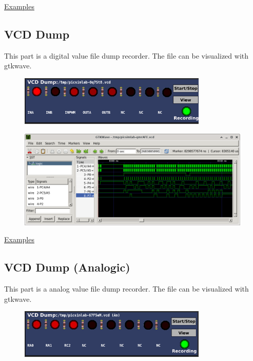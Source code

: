 \href{https://lcgamboa.github.io/picsimlab_examples/examples/examples_index.html\#Signal\_Generator}{Examples}

\subsection{VCD Dump}

This part is a digital value file dump recorder. The file can be visualized with gtkwave. 

\begin{figure}[H]
\center
\includegraphics[width=0.8\textwidth]{img/part_vcd_dump.png} 
\end{figure}



\begin{figure}[H]
\center
\includegraphics[width=0.99\textwidth]{img/part_vcd_dump_gtkwave.png} 
\end{figure}

\href{https://lcgamboa.github.io/picsimlab_examples/examples/examples_index.html\#VCD_Dump}{Examples}


\subsection{VCD Dump (Analogic)}


This part is a analog value file dump recorder. The file can be visualized with gtkwave.  

\begin{figure}[H]
\center
\includegraphics[width=0.8\textwidth]{img/part_vcd_dump_an.png} 
\end{figure}



